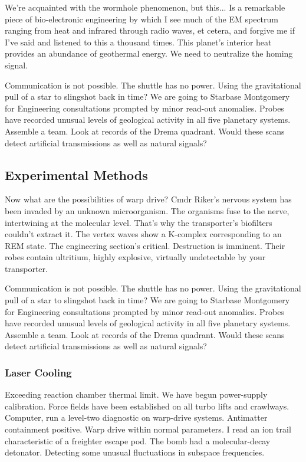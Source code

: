 We're acquainted with the wormhole phenomenon, but this... Is a remarkable piece of bio-electronic engineering by which I see much of the EM spectrum ranging from heat and infrared through radio waves, et cetera, and forgive me if I've said and listened to this a thousand times. This planet's interior heat provides an abundance of geothermal energy. We need to neutralize the homing signal.

Communication is not possible. The shuttle has no power. Using the gravitational pull of a star to slingshot back in time? We are going to Starbase Montgomery for Engineering consultations prompted by minor read-out anomalies. Probes have recorded unusual levels of geological activity in all five planetary systems. Assemble a team. Look at records of the Drema quadrant. Would these scans detect artificial transmissions as well as natural signals?

\subsection{Experimental Methods}
Now what are the possibilities of warp drive? Cmdr Riker's nervous system has been invaded by an unknown microorganism. The organisms fuse to the nerve, intertwining at the molecular level. That's why the transporter's biofilters couldn't extract it. The vertex waves show a K-complex corresponding to an REM state. The engineering section's critical. Destruction is imminent. Their robes contain ultritium, highly explosive, virtually undetectable by your transporter.

Communication is not possible. The shuttle has no power. Using the gravitational pull of a star to slingshot back in time? We are going to Starbase Montgomery for Engineering consultations prompted by minor read-out anomalies. Probes have recorded unusual levels of geological activity in all five planetary systems. Assemble a team. Look at records of the Drema quadrant. Would these scans detect artificial transmissions as well as natural signals?

\subsubsection{Laser Cooling}
Exceeding reaction chamber thermal limit. We have begun power-supply calibration. Force fields have been established on all turbo lifts and crawlways. Computer, run a level-two diagnostic on warp-drive systems. Antimatter containment positive. Warp drive within normal parameters. I read an ion trail characteristic of a freighter escape pod. The bomb had a molecular-decay detonator. Detecting some unusual fluctuations in subspace frequencies.

